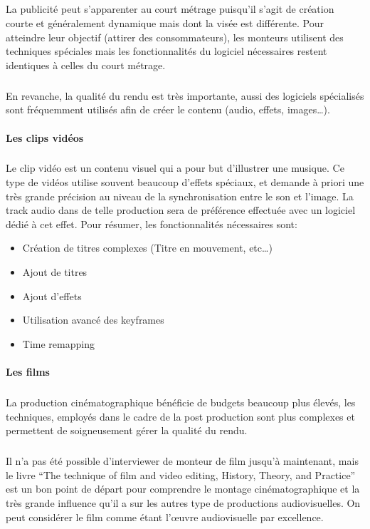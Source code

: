 \subparagraph{}

La publicité peut s'apparenter au court métrage puisqu'il s'agit de création
courte et généralement dynamique mais dont la visée est différente. Pour atteindre
leur objectif (attirer des consommateurs), les monteurs utilisent des
techniques spéciales mais les fonctionnalités du logiciel nécessaires restent
identiques à celles du court métrage.

\subparagraph{}

En revanche, la qualité du rendu est très importante, aussi des logiciels spécialisés
sont fréquemment utilisés afin de créer le contenu (audio, effets, images\ldots).

\paragraph {Les clips vidéos}

\subparagraph{}

Le clip vidéo est un contenu visuel qui a pour but d'illustrer
une musique. Ce type de vidéos utilise souvent beaucoup d'effets spéciaux, et demande à
priori une très grande précision au niveau de la synchronisation
entre le son et l'image. La track audio dans de telle production
sera de préférence effectuée avec un logiciel dédié à cet
effet. Pour résumer, les fonctionnalités nécessaires sont:
\begin{itemize} \setlength{\itemsep}{2mm}
  \item{Création de titres complexes (Titre en mouvement, etc\ldots)}
  \item{Ajout de titres}
  \item{Ajout d'effets}
  \item{Utilisation avancé des keyframes}
  \item{Time remapping}
\end{itemize}

\paragraph {Les films}

\subparagraph{}

La production cinématographique bénéficie de budgets beaucoup plus élevés, les techniques,
employés dans le cadre de la post production sont plus complexes et permettent de soigneusement
gérer la qualité du rendu.

\subparagraph{}

Il n'a pas été possible d'interviewer de monteur de film jusqu'à maintenant, mais
le livre ``The technique of film and video editing, History, Theory, and Practice''
\cite{TheTechniqueOfFilmAndVideoEditing} est un bon point de départ pour
comprendre le montage cinématographique et la très grande influence qu'il a
sur les autres type de productions audiovisuelles. On peut considérer le film comme
étant l'œuvre audiovisuelle par excellence. %

